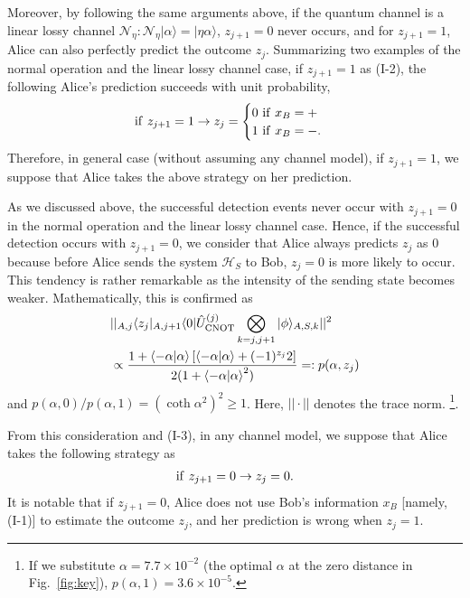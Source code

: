 \documentclass[prl,twocolumn,superscriptaddress,nofootinbib]{revtex4}
\def\U#1{{\rm #1}}
\newcommand{\bra}[1]{\langle #1 |}
\newcommand{\ket}[1]{| #1 \rangle}
\newcommand{\expect}[1]{\left\langle #1 \right\rangle}
\begin{document}
        Moreover, by following the same arguments above,
        if the quantum channel is a linear lossy channel $\mathcal{N}_{\eta}: \mathcal{N}_{\eta}\ket{\alpha}=\ket{\eta\alpha}$,
        $z_{j+1}=0$ never occurs, and for $z_{j+1}=1$, Alice can also perfectly predict the outcome $z_j$. 
Summarizing two examples of the normal operation and the linear lossy channel case, 
if $z_{j+1}=1$ as (I-2), the following Alice's prediction succeeds with unit probability,
\begin{align}
  \U{if}~z_{j+1}=1
\rightarrow z_j=
\begin{cases}
  0~\U{if}~x_B=+\\
  1~\U{if}~x_B=-.
\end{cases}
  \label{zjMz=1}
\end{align}
Therefore, in general case (without assuming any channel model), if $z_{j+1}=1$, we suppose that
Alice takes the above strategy on her prediction. 

As we discussed above, the successful detection events never occur with 
$z_{j+1}=0$ in the normal operation and the linear lossy channel case.
Hence, if the successful detection occurs with $z_{j+1}=0$, we consider that Alice always predicts $z_j$ as 0
because before Alice sends the system $\mathcal{H}_S$ to Bob, $z_j=0$ is more likely to occur.
This tendency is rather remarkable as the intensity of the sending state becomes weaker. 
Mathematically, this is confirmed as 
\begin{align}
&||{}_{A,j}\bra{z_j}{}_{A,j+1}\bra{0}\hat{U}^{(j)}_{\U{CNOT}}\bigotimes_{k=j,j+1}\ket{\phi}_{A,S,k}||^2\notag\\
  &\propto\frac{1+\expect{-\alpha|\alpha}[\expect{-\alpha|\alpha}+(-1)^{z_j}2]}{2(1+\expect{-\alpha|\alpha}^2)}=:p(\alpha,z_j)
\end{align}
and $p(\alpha,0)/p(\alpha,1)=(\coth\alpha^2)^2\geq1$. 
Here, $||\cdot||$ denotes the trace norm. 
\footnote{
  If we substitute $\alpha=7.7\times10^{-2}$ (the optimal $\alpha$ at the zero distance in Fig.~\ref{fig:key}),
  $p(\alpha,1)=3.6\times10^{-5}$.
}.
\fi

From this consideration and (I-3), in any channel model, we suppose that Alice takes the following strategy as
\begin{align}
  \U{if}~z_{j+1}=0\rightarrow z_j=0.
  \label{zjMz=0}
\end{align}
It is notable that if $z_{j+1}=0$, Alice does not use Bob's information $x_B$ [namely, (I-1)] to estimate the outcome $z_j$, and
her prediction is wrong when $z_j=1$. 
\end{document}
